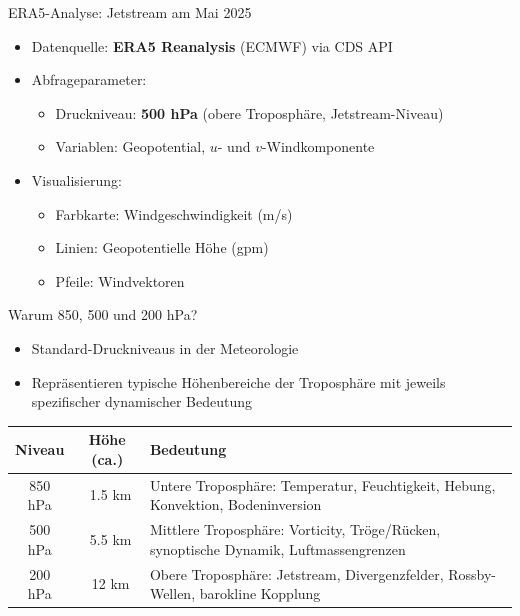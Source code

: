 \begin{frame}{ERA5-Analyse: Jetstream am Mai 2025}
	\begin{itemize}
		\item Datenquelle: \textbf{ERA5 Reanalysis} (ECMWF) via CDS API
		\item Abfrageparameter:
		      \begin{itemize}
			      \item Druckniveau: \textbf{500 hPa} (obere Troposphäre, Jetstream-Niveau)
			      \item Variablen: Geopotential, \( u \)- und \( v \)-Windkomponente
		      \end{itemize}
		\item Visualisierung:
		      \begin{itemize}
			      \item Farbkarte: Windgeschwindigkeit (m/s)
			      \item Linien: Geopotentielle Höhe (gpm)
			      \item Pfeile: Windvektoren
		      \end{itemize}
	\end{itemize}
\end{frame}
\begin{frame}{Warum 850, 500 und 200 hPa?}
	\vspace{-0.3cm}
	\begin{itemize}
		\item Standard-Druckniveaus in der Meteorologie
		\item Repräsentieren typische Höhenbereiche der Troposphäre mit jeweils spezifischer dynamischer Bedeutung
	\end{itemize}

	\vspace{0.2cm}
	\begin{table}[h]
		\centering
		\begin{tabular}{|c|c|p{7cm}|}
			\hline
			\textbf{Niveau} & \textbf{Höhe (ca.)} & \textbf{Bedeutung}                                                                    \\
			\hline
			850 hPa         & ~1.5 km             & Untere Troposphäre: Temperatur, Feuchtigkeit, Hebung, Konvektion, Bodeninversion      \\
			\hline
			500 hPa         & ~5.5 km             & Mittlere Troposphäre: Vorticity, Tröge/Rücken, synoptische Dynamik, Luftmassengrenzen \\
			\hline
			200 hPa         & ~12 km              & Obere Troposphäre: Jetstream, Divergenzfelder, Rossby-Wellen, barokline Kopplung      \\
			\hline
		\end{tabular}
	\end{table}
\end{frame}


